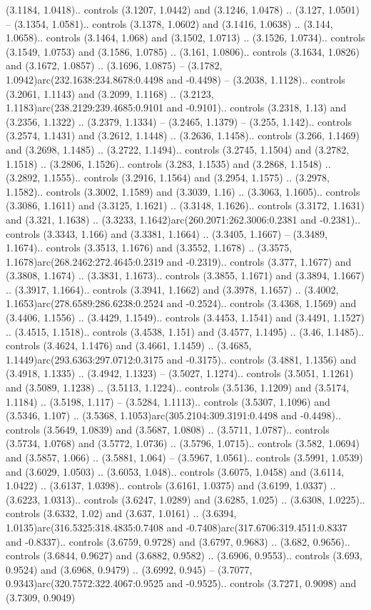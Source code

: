 (3.1184, 1.0418).. controls (3.1207, 1.0442) and (3.1246, 1.0478) .. (3.127, 1.0501) -- (3.1354, 1.0581).. controls (3.1378, 1.0602) and (3.1416, 1.0638) .. (3.144, 1.0658).. controls (3.1464, 1.068) and (3.1502, 1.0713) .. (3.1526, 1.0734).. controls (3.1549, 1.0753) and (3.1586, 1.0785) .. (3.161, 1.0806).. controls (3.1634, 1.0826) and (3.1672, 1.0857) .. (3.1696, 1.0875) -- (3.1782, 1.0942)arc(232.1638:234.8678:0.4498 and -0.4498) -- (3.2038, 1.1128).. controls (3.2061, 1.1143) and (3.2099, 1.1168) .. (3.2123, 1.1183)arc(238.2129:239.4685:0.9101 and -0.9101).. controls (3.2318, 1.13) and (3.2356, 1.1322) .. (3.2379, 1.1334) -- (3.2465, 1.1379) -- (3.255, 1.142).. controls (3.2574, 1.1431) and (3.2612, 1.1448) .. (3.2636, 1.1458).. controls (3.266, 1.1469) and (3.2698, 1.1485) .. (3.2722, 1.1494).. controls (3.2745, 1.1504) and (3.2782, 1.1518) .. (3.2806, 1.1526).. controls (3.283, 1.1535) and (3.2868, 1.1548) .. (3.2892, 1.1555).. controls (3.2916, 1.1564) and (3.2954, 1.1575) .. (3.2978, 1.1582).. controls (3.3002, 1.1589) and (3.3039, 1.16) .. (3.3063, 1.1605).. controls (3.3086, 1.1611) and (3.3125, 1.1621) .. (3.3148, 1.1626).. controls (3.3172, 1.1631) and (3.321, 1.1638) .. (3.3233, 1.1642)arc(260.2071:262.3006:0.2381 and -0.2381).. controls (3.3343, 1.166) and (3.3381, 1.1664) .. (3.3405, 1.1667) -- (3.3489, 1.1674).. controls (3.3513, 1.1676) and (3.3552, 1.1678) .. (3.3575, 1.1678)arc(268.2462:272.4645:0.2319 and -0.2319).. controls (3.377, 1.1677) and (3.3808, 1.1674) .. (3.3831, 1.1673).. controls (3.3855, 1.1671) and (3.3894, 1.1667) .. (3.3917, 1.1664).. controls (3.3941, 1.1662) and (3.3978, 1.1657) .. (3.4002, 1.1653)arc(278.6589:286.6238:0.2524 and -0.2524).. controls (3.4368, 1.1569) and (3.4406, 1.1556) .. (3.4429, 1.1549).. controls (3.4453, 1.1541) and (3.4491, 1.1527) .. (3.4515, 1.1518).. controls (3.4538, 1.151) and (3.4577, 1.1495) .. (3.46, 1.1485).. controls (3.4624, 1.1476) and (3.4661, 1.1459) .. (3.4685, 1.1449)arc(293.6363:297.0712:0.3175 and -0.3175).. controls (3.4881, 1.1356) and (3.4918, 1.1335) .. (3.4942, 1.1323) -- (3.5027, 1.1274).. controls (3.5051, 1.1261) and (3.5089, 1.1238) .. (3.5113, 1.1224).. controls (3.5136, 1.1209) and (3.5174, 1.1184) .. (3.5198, 1.117) -- (3.5284, 1.1113).. controls (3.5307, 1.1096) and (3.5346, 1.107) .. (3.5368, 1.1053)arc(305.2104:309.3191:0.4498 and -0.4498).. controls (3.5649, 1.0839) and (3.5687, 1.0808) .. (3.5711, 1.0787).. controls (3.5734, 1.0768) and (3.5772, 1.0736) .. (3.5796, 1.0715).. controls (3.582, 1.0694) and (3.5857, 1.066) .. (3.5881, 1.064) -- (3.5967, 1.0561).. controls (3.5991, 1.0539) and (3.6029, 1.0503) .. (3.6053, 1.048).. controls (3.6075, 1.0458) and (3.6114, 1.0422) .. (3.6137, 1.0398).. controls (3.6161, 1.0375) and (3.6199, 1.0337) .. (3.6223, 1.0313).. controls (3.6247, 1.0289) and (3.6285, 1.025) .. (3.6308, 1.0225).. controls (3.6332, 1.02) and (3.637, 1.0161) .. (3.6394, 1.0135)arc(316.5325:318.4835:0.7408 and -0.7408)arc(317.6706:319.4511:0.8337 and -0.8337).. controls (3.6759, 0.9728) and (3.6797, 0.9683) .. (3.682, 0.9656).. controls (3.6844, 0.9627) and (3.6882, 0.9582) .. (3.6906, 0.9553).. controls (3.693, 0.9524) and (3.6968, 0.9479) .. (3.6992, 0.945) -- (3.7077, 0.9343)arc(320.7572:322.4067:0.9525 and -0.9525).. controls (3.7271, 0.9098) and (3.7309, 0.9049) 